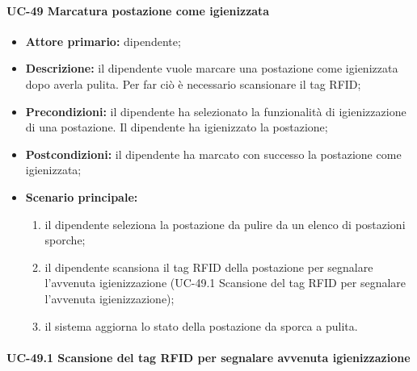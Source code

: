 \paragraph{UC-49 Marcatura postazione come igienizzata}
    \begin{itemize}
        \item \textbf{Attore primario:} dipendente;

        \item \textbf{Descrizione:} il dipendente vuole marcare una postazione come igienizzata dopo averla pulita. Per far ciò è necessario scansionare il tag RFID;

        \item \textbf{Precondizioni:} il dipendente ha selezionato la funzionalità di igienizzazione di una postazione. Il dipendente ha igienizzato la postazione;

        \item \textbf{Postcondizioni:} il dipendente ha marcato con successo la postazione come igienizzata;

        \item \textbf{Scenario principale:}
            \begin{enumerate}
                \item il dipendente seleziona la postazione da pulire da un elenco di postazioni sporche;
                \item il dipendente scansiona il tag RFID della postazione per segnalare l'avvenuta igienizzazione (UC-49.1 Scansione del tag RFID per segnalare l'avvenuta igienizzazione);
                \item il sistema aggiorna lo stato della postazione da sporca a pulita.
            \end{enumerate}
    \end{itemize} 

\paragraph{UC-49.1 Scansione del tag RFID per segnalare avvenuta igienizzazione}
    

